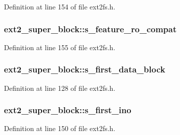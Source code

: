 \-Definition at line 154 of file ext2fs.\-h.

\hypertarget{structext2__super__block_a9c63e7954f0344d3de19aad4099d84c7}{
\subsubsection[{s\-\_\-feature\-\_\-ro\-\_\-compat}]{ {\bf ext2\-\_\-super\-\_\-block\-::s\-\_\-feature\-\_\-ro\-\_\-compat}}}\label{structext2__super__block_a9c63e7954f0344d3de19aad4099d84c7}


\-Definition at line 155 of file ext2fs.\-h.

\hypertarget{structext2__super__block_ab7c5dfba6eafbb1974f7628d4ae32601}{
\subsubsection[{s\-\_\-first\-\_\-data\-\_\-block}]{ {\bf ext2\-\_\-super\-\_\-block\-::s\-\_\-first\-\_\-data\-\_\-block}}}\label{structext2__super__block_ab7c5dfba6eafbb1974f7628d4ae32601}


\-Definition at line 128 of file ext2fs.\-h.

\hypertarget{structext2__super__block_a0d3a8f3c14e0a971750cfdfbc2cf6070}{
\subsubsection[{s\-\_\-first\-\_\-ino}]{ {\bf ext2\-\_\-super\-\_\-block\-::s\-\_\-first\-\_\-ino}}}\label{structext2__super__block_a0d3a8f3c14e0a971750cfdfbc2cf6070}


\-Definition at line 150 of file ext2fs.\-h.

